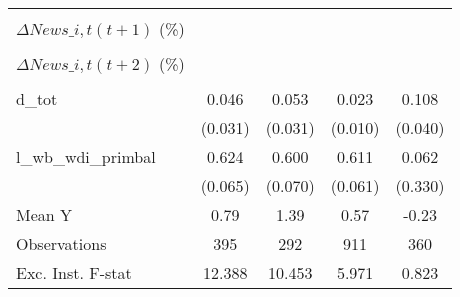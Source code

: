 {\begin{tabular}{l*{4}{c}}
                    &                     &                     &                     &                     \\
\addlinespace
$ \Delta News\_{i,t}(t+1)$ (\%)&                     &                     &                     &                     \\
                    &                     &                     &                     &                     \\
\addlinespace
$ \Delta News\_{i,t}(t+2)$ (\%)&                     &                     &                     &                     \\
                    &                     &                     &                     &                     \\
\addlinespace
d\_tot               &       0.046         &       0.053\sym{*}  &       0.023\sym{**} &       0.108\sym{***}\\
                    &     (0.031)         &     (0.031)         &     (0.010)         &     (0.040)         \\
\addlinespace
l\_wb\_wdi\_primbal    &       0.624\sym{***}&       0.600\sym{***}&       0.611\sym{***}&       0.062         \\
                    &     (0.065)         &     (0.070)         &     (0.061)         &     (0.330)         \\
\midrule
Mean Y              &        0.79         &        1.39         &        0.57         &       -0.23         \\
Observations        &         395         &         292         &         911         &         360         \\
Exc. Inst. F-stat   &      12.388         &      10.453         &       5.971         &       0.823         \\
\bottomrule
\end{tabular}
}
